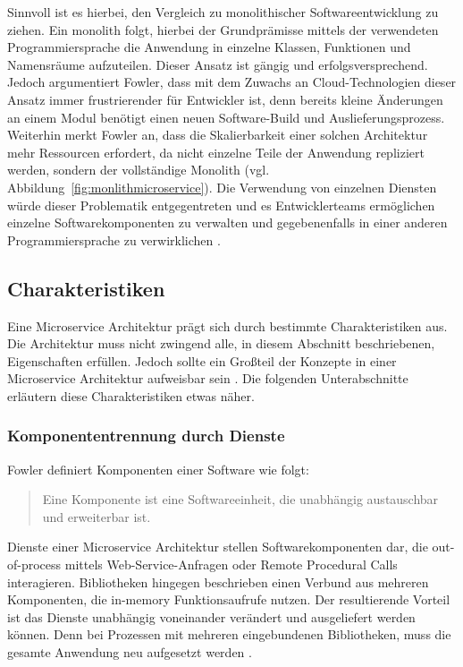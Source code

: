Sinnvoll ist es hierbei, den Vergleich zu monolithischer Softwareentwicklung zu ziehen. 
Ein monolith folgt, hierbei der Grundprämisse mittels der verwendeten Programmiersprache die Anwendung in einzelne Klassen, Funktionen und Namensräume aufzuteilen. 
Dieser Ansatz ist gängig und erfolgsversprechend. 
Jedoch argumentiert Fowler, dass mit dem Zuwachs an Cloud-Technologien dieser Ansatz immer frustrierender für Entwickler ist, denn bereits kleine Änderungen an einem Modul benötigt einen neuen Software-Build und Auslieferungsprozess. 
Weiterhin merkt Fowler an, dass die Skalierbarkeit einer solchen Architektur mehr Ressourcen erfordert, da nicht einzelne Teile der Anwendung repliziert werden, sondern der vollständige Monolith (vgl. Abbildung~\ref{fig:monlithmicroservice}).
Die Verwendung von einzelnen Diensten würde dieser Problematik entgegentreten und es Entwicklerteams ermöglichen einzelne Softwarekomponenten zu verwalten und gegebenenfalls in einer anderen Programmiersprache zu verwirklichen \cite{FowlerMicroservice}.

\subsection{Charakteristiken}

Eine Microservice Architektur prägt sich durch bestimmte Charakteristiken aus. 
Die Architektur muss nicht zwingend alle, in diesem Abschnitt beschriebenen, Eigenschaften erfüllen. 
Jedoch sollte ein Großteil der Konzepte in einer Microservice Architektur aufweisbar sein \cite{FowlerMicroservice}. 
Die folgenden Unterabschnitte erläutern diese Charakteristiken etwas näher.

\subsubsection{Komponententrennung durch Dienste}
Fowler definiert Komponenten einer Software wie folgt: \begin{quote}\glqq Eine Komponente ist eine Softwareeinheit, die unabhängig austauschbar und erweiterbar ist.\grqq{} \cite{FowlerSoftwareComponent} \end{quote}

Dienste einer Microservice Architektur stellen Softwarekomponenten dar, die out-of-process mittels Web-Service-Anfragen oder Remote Procedural Calls interagieren.
Bibliotheken hingegen beschrieben einen Verbund aus mehreren Komponenten, die in-memory Funktionsaufrufe nutzen. 
Der resultierende Vorteil ist das Dienste unabhängig voneinander verändert und ausgeliefert werden können. 
Denn bei Prozessen mit mehreren eingebundenen Bibliotheken, muss die gesamte Anwendung neu aufgesetzt werden \cite{FowlerMicroservice}. 

